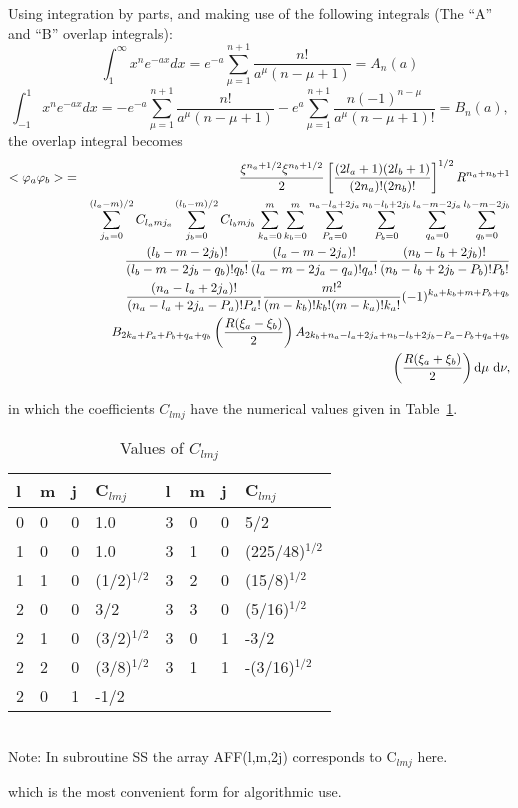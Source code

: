 Using integration by parts, and making use of the following
integrals (The ``A'' and ``B'' overlap integrals): \label{ab}
$$
\int_1^{\infty}x^ne^{-ax}dx=e^{-a}\sum_{\mu=1}^{n+1}\frac{n!}{a^{\mu}(n-\mu+1)}=A_n(a)
$$
$$
\int_{-1}^{1}x^ne^{-ax}dx=-e^{-a}\sum_{\mu=1}^{n+1}\frac{n!}{a^{\mu}(n-\mu+1)}
-e^a\sum_{\mu=1}^{n+1}\frac{n(-1)^{n-\mu}}{a^{\mu}(n-\mu+1)!} =B_n(a),
$$
the overlap integral becomes
\begin{eqnarray}
<\varphi _a\varphi _b>& =&
\frac{\xi ^{n_a+1/2}\xi^{n_b+1/2}}{2}\left [\frac{(2l_a+1)(2l_b+1)}{(2n_a)!(2n_b)!}\right ]
^{1/2}R^{n_a+n_b+1} \nonumber \\ &&
\sum_{j_a=0}^{(l_a-m)/2}C_{l_amj_a}\sum_{j_b=0}^{(l_b-m)/2}
C_{l_bmj_b}\sum_{k_a=0}^m\sum_{k_b=0}^m
\sum_{P_a=0}^{n_a-l_a+2j_a}\sum_{P_b=0}^{n_b-l_b+2j_b}
\sum_{q_a=0}^{l_a-m-2j_a}\sum_{q_b=0}^{l_b-m-2j_b} \nonumber \\ &&
\frac{(l_b-m-2j_b)!}{(l_b-m-2j_b-q_b)!q_b!}
\frac{(l_a-m-2j_a)!}{(l_a-m-2j_a-q_a)!q_a!}
\frac{(n_b-l_b+2j_b)!}{(n_b-l_b+2j_b-P_b)!P_b!} \nonumber \\ &&
\frac{(n_a-l_a+2j_a)!}{(n_a-l_a+2j_a-P_a)!P_a!}
\frac{m!^2}{(m-k_b)!k_b!(m-k_a)!k_a!}
(-1)^{k_a+k_b+m+P_b+q_b} \nonumber \\ &&
B_{2k_a+P_a+P_b+q_a+q_b}\left (\frac{R(\xi_a-\xi_b)}{2}\right )
A_{2k_b+n_a-l_a+2j_a+n_b-l_b+2j_b-P_a-P_b+q_a+q_b}\nonumber \\ &&
\left (\frac{R(\xi_a+\xi_b)}{2}\right )
{\rm d}\mu\ {\rm d}\nu , \nonumber
\end{eqnarray}


in which the coefficients $C_{lmj}$ have the numerical values given
in Table~\ref{clmj}.
\begin{table}
\caption{\label{clmj} Values of $C_{lmj}$}
\begin{center}
\begin{tabular}{llllllll} \hline
l & m & j & C$_{lmj}$    & l & m & j & C$_{lmj}$ \\ \hline
0 & 0 & 0 & 1.0        & 3 & 0 & 0 & 5/2 \\
1 & 0 & 0 & 1.0        & 3 & 1 & 0 & (225/48)$^{1/2}$ \\
1 & 1 & 0 & (1/2)$^{1/2}$ & 3 & 2 & 0 & (15/8)$^{1/2}$ \\
2 & 0 & 0 & 3/2        & 3 & 3 & 0 & (5/16)$^{1/2}$ \\
2 & 1 & 0 & (3/2)$^{1/2}$ & 3 & 0 & 1 & -3/2 \\
2 & 2 & 0 & (3/8)$^{1/2}$ & 3 & 1 & 1 & -(3/16)$^{1/2}$ \\
2 & 0 & 1 & -1/2       & \\ \hline
\end{tabular}\\
Note: In subroutine SS the array AFF(l,m,2j) corresponds to C$_{lmj}$ here.
\end{center}
\end{table}
which is the most convenient form for algorithmic use.

